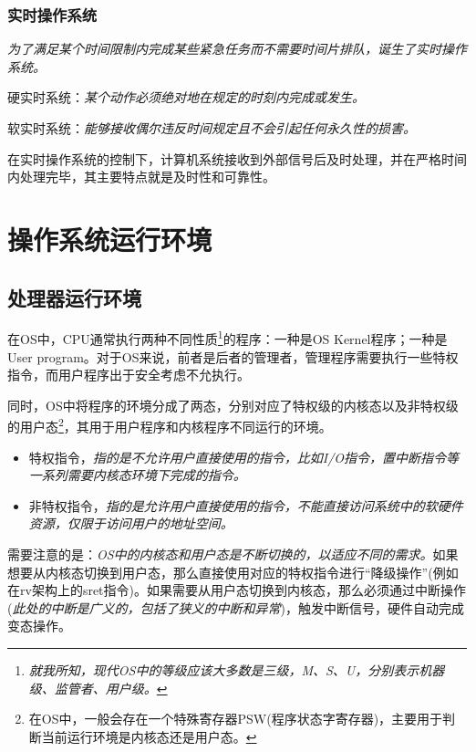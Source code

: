 \subsubsection{实时操作系统}

    \emph{为了满足某个时间限制内完成某些紧急任务而不需要时间片排队，诞生了实时操作系统。}

    硬实时系统：\emph{某个动作必须绝对地在规定的时刻内完成或发生。}

    软实时系统：\emph{能够接收偶尔违反时间规定且不会引起任何永久性的损害。}

    在实时操作系统的控制下，计算机系统接收到外部信号后及时处理，并在严格时间内处理完毕，其主要特点就是{\color{red}及时性和可靠性}。

\section{操作系统运行环境}

\subsection{处理器运行环境}

    在OS中，CPU通常执行两种不同性质\footnote[1]{\emph{就我所知，现代OS中的等级应该大多数是三级，M、S、U，分别表示机器级、监管者、用户级。}}的程序：一种是OS Kernel程序；一种是User program。对于OS来说，前者是后者的管理者，管理程序需要执行一些特权指令，而用户程序出于安全考虑不允执行。

    同时，OS中将程序的环境分成了两态，分别对应了{\color{red}特权级的内核态}以及{\color{red}非特权级的用户态}\footnote[1]{在OS中，一般会存在一个特殊寄存器PSW(程序状态字寄存器)，主要用于判断当前运行环境是内核态还是用户态。}，其用于用户程序和内核程序不同运行的环境。

\begin{itemize}
    \item [1)] 特权指令，\emph{指的是不允许用户直接使用的指令，比如I/O指令，置中断指令等一系列需要内核态环境下完成的指令。}
    \item [2)] 非特权指令，\emph{指的是允许用户直接使用的指令，不能直接访问系统中的软硬件资源，仅限于访问用户的地址空间。}
\end{itemize}

    需要注意的是：\emph{{\color{red}OS中的内核态和用户态是不断切换的，以适应不同的需求。}}如果想要从内核态切换到用户态，那么直接使用对应的特权指令进行“降级操作”(例如在rv架构上的sret指令)。如果需要从用户态切换到内核态，那么必须通过中断操作(\emph{{\color{red}此处的中断是广义的，包括了狭义的中断和异常}})，触发中断信号，{\color{red}硬件自动完成变态操作}。


